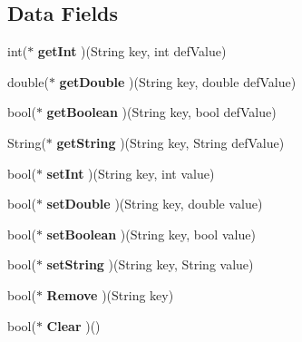 \subsection*{Data Fields}
\begin{DoxyCompactItemize}
\item 
\hypertarget{struct__Preference_a354ae0d851333f72a06ea51e0bcb8360}{int($\ast$ {\bfseries get\-Int} )(String key, int def\-Value)}\label{struct__Preference_a354ae0d851333f72a06ea51e0bcb8360}

\item 
\hypertarget{struct__Preference_a96f41840c325a881dc63177979b83b52}{double($\ast$ {\bfseries get\-Double} )(String key, double def\-Value)}\label{struct__Preference_a96f41840c325a881dc63177979b83b52}

\item 
\hypertarget{struct__Preference_a32b9944e22dd04233008ebc1afba21c8}{bool($\ast$ {\bfseries get\-Boolean} )(String key, bool def\-Value)}\label{struct__Preference_a32b9944e22dd04233008ebc1afba21c8}

\item 
\hypertarget{struct__Preference_ab43532513cb470d242f06a41c90c2320}{String($\ast$ {\bfseries get\-String} )(String key, String def\-Value)}\label{struct__Preference_ab43532513cb470d242f06a41c90c2320}

\item 
\hypertarget{struct__Preference_a6417c5ebd12f4db875a6cd38ef44be02}{bool($\ast$ {\bfseries set\-Int} )(String key, int value)}\label{struct__Preference_a6417c5ebd12f4db875a6cd38ef44be02}

\item 
\hypertarget{struct__Preference_a0d0e596ceb6c5a3550393ccef4c75ae2}{bool($\ast$ {\bfseries set\-Double} )(String key, double value)}\label{struct__Preference_a0d0e596ceb6c5a3550393ccef4c75ae2}

\item 
\hypertarget{struct__Preference_a485c55e39fd4e98f77330a0db4cb7356}{bool($\ast$ {\bfseries set\-Boolean} )(String key, bool value)}\label{struct__Preference_a485c55e39fd4e98f77330a0db4cb7356}

\item 
\hypertarget{struct__Preference_af78be25d0215f85c626cbc4743622b09}{bool($\ast$ {\bfseries set\-String} )(String key, String value)}\label{struct__Preference_af78be25d0215f85c626cbc4743622b09}

\item 
\hypertarget{struct__Preference_a7edaf50caa291810d8f0ece33aa870a4}{bool($\ast$ {\bfseries Remove} )(String key)}\label{struct__Preference_a7edaf50caa291810d8f0ece33aa870a4}

\item 
\hypertarget{struct__Preference_a52f04c61197aaf2ff41e083fcd140bf6}{bool($\ast$ {\bfseries Clear} )()}\label{struct__Preference_a52f04c61197aaf2ff41e083fcd140bf6}

\end{DoxyCompactItemize}


